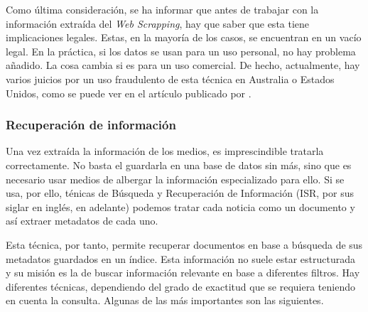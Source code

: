 Como última consideración, se ha informar que antes de trabajar con la información extraída del \textit{Web Scrapping}, hay que saber que esta tiene implicaciones legales. Estas, en la mayoría de los casos, se encuentran en un vacío legal. En la práctica, si los datos se usan para un uso personal, no hay problema añadido. La cosa cambia si es para un uso comercial. De hecho, actualmente, hay varios juicios por un uso fraudulento de esta técnica en Australia o Estados Unidos, como se puede ver en el artículo publicado por .

\subsubsection{Recuperación de información}
Una vez extraída la información de los medios, es imprescindible tratarla correctamente. No basta el guardarla en una base de datos sin más, sino que es necesario usar medios de albergar la información especializado para ello. Si se usa, por ello, ténicas de Búsqueda y Recuperación de Información (ISR, por sus siglar en inglés, en adelante) podemos tratar cada noticia como un documento y así extraer metadatos de cada uno.


Esta técnica, por tanto, permite recuperar documentos en base a búsqueda de sus metadatos guardados en un índice. Esta información no suele estar estructurada y su misión es la de buscar información relevante en base a diferentes filtros. Hay diferentes técnicas, dependiendo del grado de exactitud que se requiera teniendo en cuenta la consulta. Algunas de las más importantes son las siguientes.

